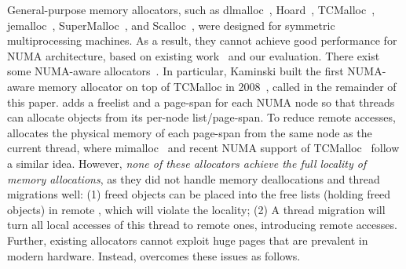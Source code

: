 
General-purpose memory allocators, such as dlmalloc~\cite{dlmalloc},  Hoard~\cite{Hoard}, TCMalloc~\cite{tcmalloc}, jemalloc~\cite{jemalloc}, SuperMalloc~\cite{supermalloc}, and  Scalloc~\cite{Scalloc}, were designed for symmetric multiprocessing machines. As a result, they cannot achieve good performance for NUMA architecture, based on existing work~\cite{tcmallocnuma, yang2019jarena} and our evaluation. There exist some NUMA-aware allocators~\cite{tcmallocnuma, tcmalloc2, kim2013node, yang2019jarena, mimalloc}. In particular, Kaminski built the first NUMA-aware memory allocator on top of TCMalloc in 2008~\cite{tcmallocnuma}, called \TN{} in the remainder of this paper. \TN{} adds a freelist  and a page-span for each NUMA node so that threads can allocate objects from its per-node list/page-span. To reduce remote accesses, \TN{} allocates the physical memory of each page-span from the same node as the current thread, where mimalloc~\cite{mimalloc} and recent NUMA support of TCMalloc~\cite{tcmalloc2}
follow a similar idea.  
However, \textit{none of these allocators achieve the full locality of memory allocations}, as they did not handle memory deallocations and thread migrations well: (1)  freed objects can be placed into the free lists (holding freed objects)  in  remote , 
which will violate the locality;
(2) A thread migration will turn all local accesses of this thread to remote ones, introducing  remote accesses. Further, existing allocators cannot exploit huge pages that are prevalent in modern hardware. Instead, \NM{} overcomes these issues as follows. 

